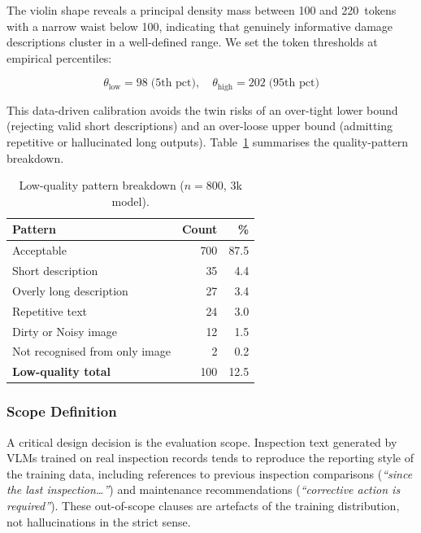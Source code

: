 \documentclass[twocolumn]{article}
\begin{document}
The violin shape reveals a principal density mass between 100 and 220~tokens
with a narrow waist below 100, indicating that genuinely informative damage
descriptions cluster in a well-defined range.
We set the token thresholds at empirical percentiles:

\begin{equation}
  \theta_{\text{low}} = 98 \;\text{(5th pct)}, \quad
  \theta_{\text{high}} = 202 \;\text{(95th pct)}
  \label{eq:thresholds}
\end{equation}

\noindent
This data-driven calibration avoids the twin risks of an over-tight lower bound
(rejecting valid short descriptions) and an over-loose upper bound
(admitting repetitive or hallucinated long outputs).
Table~\ref{tab:lq_patterns} summarises the quality-pattern breakdown.

\begin{table}[h]
\centering
\caption{Low-quality pattern breakdown ($n=800$, 3k model).}
\label{tab:lq_patterns}
\setlength{\tabcolsep}{4pt}
\begin{tabular}{lrr}
\toprule
\textbf{Pattern} & \textbf{Count} & \textbf{\%} \\
\midrule
Acceptable                     & 700 & 87.5 \\
Short description              &  35 &  4.4 \\
Overly long description        &  27 &  3.4 \\
Repetitive text                &  24 &  3.0 \\
Dirty or Noisy image           &  12 &  1.5 \\
Not recognised from only image &   2 &  0.2 \\
\midrule
\textbf{Low-quality total}     & 100 & 12.5 \\
\bottomrule
\end{tabular}
\end{table}

\subsubsection{Scope Definition}

A critical design decision is the evaluation scope.
Inspection text generated by VLMs trained on real inspection records tends to
reproduce the reporting style of the training data, including references to
previous inspection comparisons (\textit{``since the last inspection\ldots''})
and maintenance recommendations (\textit{``corrective action is required''}).
These out-of-scope clauses are artefacts of the training distribution,
not hallucinations in the strict sense.
\end{document}

